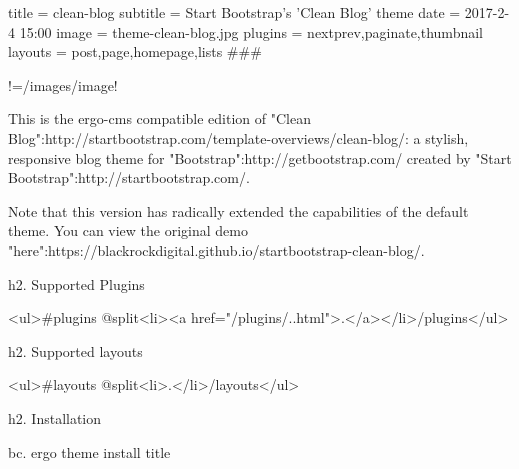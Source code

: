 title = clean-blog
subtitle = Start Bootstrap's 'Clean Blog' theme
date = 2017-2-4 15:00
image = theme-clean-blog.jpg
plugins = nextprev,paginate,thumbnail
layouts = post,page,homepage,lists
###

!=/images/{{image}}!

This is the ergo-cms compatible edition of "Clean Blog":http://startbootstrap.com/template-overviews/clean-blog/: a stylish, responsive blog theme for "Bootstrap":http://getbootstrap.com/ created by "Start Bootstrap":http://startbootstrap.com/. 

Note that this version has radically extended the capabilities of the default theme. You can view the original demo "here":https://blackrockdigital.github.io/startbootstrap-clean-blog/.

h2. Supported Plugins

<ul>{{#plugins @split}}<li><a href="/plugins/{{.}}.html">{{.}}</a></li>{{/plugins}}</ul>

h2. Supported layouts

<ul>{{#layouts @split}}<li>{{.}}</li>{{/layouts}}</ul>

h2. Installation

bc. ergo theme install {{title}}





